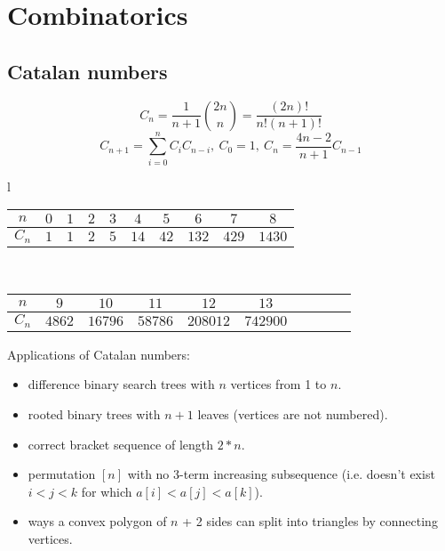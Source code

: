 \section{Combinatorics}
\subsection{Catalan numbers}
\[ C_n = \frac{1}{n + 1} {2n \choose n} = \frac{(2n)!}{n!(n+1)!}\]
\[ C_{n + 1} = \displaystyle\sum_{i = 0}^{n}C_i C_{n - i},\ C_0 = 1,\ C_n = \frac{4n - 2}{n + 1}C_{n - 1}\]

\begin{center}
  \begin{tabular}{l}
    \begin{tabular}{c|c@{\ }c@{\ }c@{\ }c@{\ }c@{\ }c@{\ }c@{\ }c@{\ }c}
      $n$ & $0$ & $1$ & $2$ & $3$ & $4$ & $5$ & $6$ & $7$ & $8$ \\
      \hline
      $C_n$ & $1$ & $1$ & $2$ & $5$ & $14$ & $42$ & $132$ & $429$ & $1430$ \\
    \end{tabular} \\
    \begin{tabular}{c|c@{\ }c@{\ }c@{\ }c@{\ }c@{\ }c@{\ }c@{\ }c@{\ }c}
      $n$ & $9$ & $10$ & $11$ & $12$ & $13$ \\
      \hline
      $C_n$ & $4862$ & $16796$ & $58786$ & $208012$ & $742900$
    \end{tabular}
  \end{tabular}
\end{center}
Applications of Catalan numbers:
\begin{itemize}[leftmargin=*]
  \item difference binary search trees with $n$ vertices from 1 to $n$.
  \item rooted binary trees with $n + 1$ leaves (vertices are not numbered).
  \item correct bracket sequence of length $2 * n$.
  \item permutation $[n]$ with no 3-term increasing subsequence (i.e. doesn't exist $i < j < k$ for which $a[i] < a[j] < a[k]$).
  \item ways a convex polygon of $n$ + 2 sides can split into triangles by connecting vertices.
\end{itemize}


